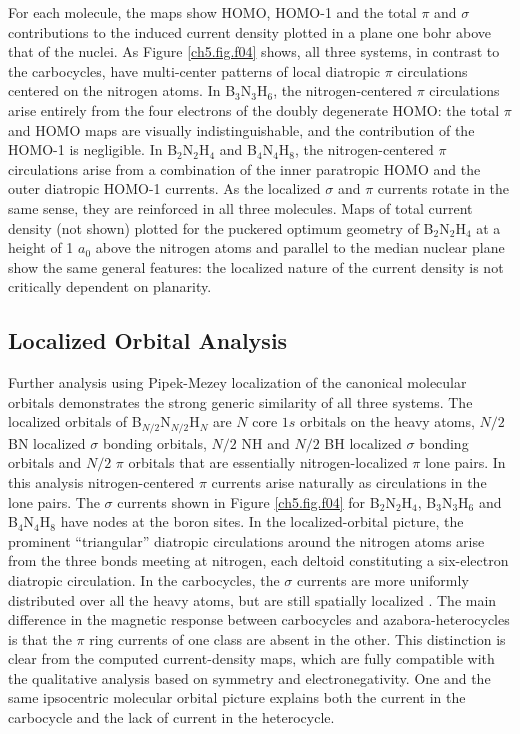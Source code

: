 For each molecule, the maps show HOMO, \mbox{HOMO-1} and the total $\pi$ and $\sigma$ contributions to the induced current density plotted in a plane one bohr above
that of the nuclei. As Figure \ref{ch5.fig.f04} shows, all three systems, in contrast to the carbocycles, have multi-center patterns of local diatropic $\pi$ circulations centered on the
nitrogen atoms. In B$_3$N$_3$H$_6$, the nitrogen-centered $\pi$ circulations arise entirely from the four electrons of the doubly degenerate HOMO:
the total $\pi$ and HOMO maps are visually indistinguishable, and the contribution of the \mbox{HOMO-1} is negligible. In B$_2$N$_2$H$_4$ and B$_4$N$_4$H$_8$, the
nitrogen-centered $\pi$ circulations arise from a combination of the inner paratropic HOMO and the outer diatropic \mbox{HOMO-1} currents. As the localized
$\sigma$ and $\pi$ currents rotate in the same sense, they are reinforced in all three molecules. Maps of total current density (not shown) plotted for the puckered optimum
geometry of B$_2$N$_2$H$_4$ at a height of 1 $a_0$ above the nitrogen atoms and parallel to the median nuclear plane show the same general features:
the localized nature of the current density is not critically dependent on planarity.

\subsection{Localized Orbital Analysis}
Further analysis using Pipek-Mezey localization of the canonical molecular orbitals \cite{r31} demonstrates the strong generic similarity of all three systems.
The localized orbitals of B$_{N/2}$N$_{N/2}$H$_N$ are $N$ core $1s$ orbitals on the heavy atoms, $N/2$ BN localized $\sigma$ bonding orbitals,
$N/2$ NH and $N/2$ BH localized $\sigma$ bonding orbitals and $N/2$ $\pi$ orbitals that are essentially nitrogen-localized $\pi$ lone
pairs. In this analysis nitrogen-centered $\pi$ currents arise naturally as circulations in the lone pairs. The $\sigma$ currents shown
in Figure \ref{ch5.fig.f04} for B$_2$N$_2$H$_4$, B$_3$N$_3$H$_6$ and B$_4$N$_4$H$_8$ have nodes at the boron sites. In the localized-orbital picture, the prominent
``triangular'' diatropic circulations around the nitrogen atoms arise from the three bonds meeting at nitrogen, each
deltoid constituting a six-electron diatropic circulation. In the carbocycles, the $\sigma$ currents are more uniformly distributed
over all the heavy atoms, but are still spatially localized \cite{r32}. The main difference in the magnetic response between
carbocycles and azabora-heterocycles is that the $\pi$ ring currents of one class are absent in the other. This distinction
is clear from the computed current-density maps, which are fully compatible with the qualitative analysis based
on symmetry and electronegativity. One and the same ipsocentric molecular orbital picture explains both the current in
the carbocycle and the lack of current in the heterocycle.

